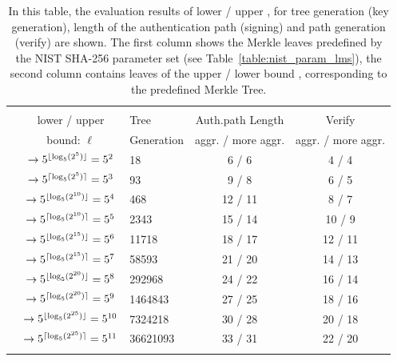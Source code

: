 \begin{table}
\centering
\begin{tabular}{r c l c c} 
 \hline\noalign{\smallskip}
 \multicolumn{5}{c}{\textbf{Evaluation Results: Lower / Upper Bound \tftree\xspace/\xspace\extree}} \\
 \noalign{\smallskip} 
 & lower / upper  & Tree & Auth.path Length & Verify \\
 \noalign{\smallskip}
 & bound: $\ell$  & Generation & aggr. / more aggr. & aggr. / more aggr.\\
 \hline\noalign{\smallskip}
 \multirow{2}{*}{$2^5$} & $\rightarrow 5^{\lfloor\log_5(2^5)\rfloor} = 5^{2} $ & 18 & 6 / 6 & 4 / 4 \\
 & $\rightarrow 5^{\lceil\log_5(2^5)\rceil} = 5^{3}$ & 93 & 9 / 8 & 6 / 5 \\
 \hline\noalign{\smallskip} 
 \multirow{2}{*}{$2^{10}$} & $\rightarrow 5^{\lfloor\log_5(2^{10})\rfloor} = 5^{4}$ & 468 & 12 / 11 & 8 / 7 \\
 & $\rightarrow 5^{\lceil\log_5(2^{10})\rceil} = 5^{5}$ & 2343 & 15 / 14 & 10 / 9 \\
 \hline\noalign{\smallskip} 
 \multirow{2}{*}{$2^{15}$}& $\rightarrow 5^{\lfloor\log_5(2^{15})\rfloor} = 5^{6}$ & 11718 & 18 / 17 & 12 / 11 \\ 
 & $\rightarrow 5^{\lceil\log_5(2^{15})\rceil} = 5^{7}$ & 58593 & 21 / 20 & 14 / 13 \\ 
 \hline\noalign{\smallskip} 
 \multirow{2}{*}{$2^{20}$} & $\rightarrow 5^{\lfloor\log_5(2^{20})\rfloor} = 5^{8}$ & 292968 & 24 / 22 & 16 / 14 \\ 
 & $\rightarrow 5^{\lceil\log_5(2^{20})\rceil} = 5^{9}$ & 1464843 & 27 / 25 & 18 / 16 \\
 \hline\noalign{\smallskip}  
  \multirow{2}{*}{$2^{25}$} & $\rightarrow 5^{\lfloor\log_5(2^{25})\rfloor} =  5^{10}$ & 7324218 & 30 / 28 & 20 / 18 \\ 
 & $\rightarrow 5^{\lceil\log_5(2^{25})\rceil} = 5^{11}$ & 36621093 & 33 / 31 & 22 / 20 \\
 \hline\noalign{\smallskip}
 \end{tabular}
\caption{In this table, the evaluation results of lower / upper \tftree, \extree for tree generation (key generation), length of the authentication path (signing) and path generation (verify) are shown.
The first column shows the Merkle leaves predefined by the NIST SHA-256 parameter set (see Table~\ref{table:nist_param_lms}), the second column contains leaves of the upper / lower bound \tftree, \extree corresponding to the predefined Merkle Tree.}
\label{table:nist_upper_lower_bound}
\end{table}


